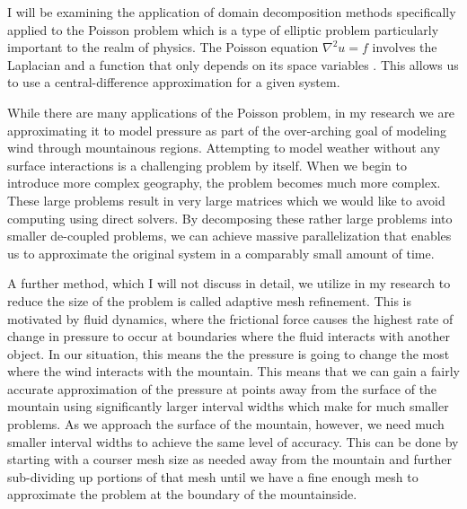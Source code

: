 I will be examining the application of domain decomposition methods specifically applied to the Poisson problem which is a type of elliptic problem particularly important to the realm of physics. The Poisson equation $\nabla^2u = f$ involves the Laplacian and a function that only depends on its space variables \cite{Farlow}. This allows us to use a central-difference approximation for a given system. 

While there are many applications of the Poisson problem, in my research we are approximating it to model pressure as part of the over-arching goal of modeling wind through mountainous regions. Attempting to model weather without any surface interactions is a challenging problem by itself. When we begin to introduce more complex geography, the problem becomes much more complex. These large problems result in very large matrices which we would like to avoid computing using direct solvers. By decomposing these rather large problems into smaller de-coupled problems, we can achieve massive parallelization that enables us to approximate the original system in a comparably small amount of time.

A further method, which I will not discuss in detail, we utilize in my research to reduce the size of the problem is called adaptive mesh refinement. This is motivated by fluid dynamics, where the frictional force causes the highest rate of change in pressure to occur at boundaries where the fluid interacts with another object. In our situation, this means the the pressure is going to change the most where the wind interacts with the mountain. This means that we can gain a fairly accurate approximation of the pressure at points away from the surface of the mountain using significantly larger interval widths which make for much smaller problems. As we approach the surface of the mountain, however, we need much smaller interval widths to achieve the same level of accuracy. This can be done by starting with a courser mesh size as needed away from the mountain and further sub-dividing up portions of that mesh until we have a fine enough mesh to approximate the problem at the boundary of the mountainside.